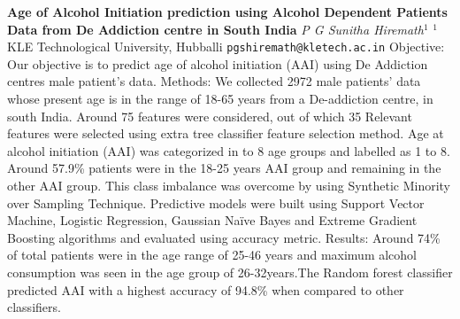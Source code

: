 
    \begin{conf-abstract}[]
        {\textbf{Age of Alcohol Initiation prediction using Alcohol Dependent Patients Data from De Addiction centre in South India}}
        {\textit{P G Sunitha Hiremath$^{1}$}}
        {$^{1}$KLE Technological University, Hubballi}
        {\texttt{pgshiremath@kletech.ac.in}}
        {Objective: Our objective is to predict age of alcohol initiation (AAI) using De Addiction centres male patient's data. Methods: We collected 2972 male patients' data whose present age is in the range of 18-65 years from a De-addiction centre, in south India. Around 75 features were considered, out of which 35 Relevant features were selected using extra tree classifier feature selection method. Age at alcohol initiation (AAI) was categorized in to 8 age groups and labelled as 1 to 8.  Around 57.9\% patients were in the 18-25 years AAI group and remaining in the other AAI group. This class imbalance was overcome by using Synthetic Minority over Sampling Technique. Predictive models were built using Support Vector Machine, Logistic Regression, Gaussian Naïve Bayes and Extreme Gradient Boosting algorithms and evaluated using accuracy metric. Results: Around 74\% of total patients were in the age range of 25-46 years and maximum alcohol consumption was seen in the age group of 26-32years.The Random forest classifier predicted AAI with a highest accuracy of 94.8\% when compared to other classifiers. }
    \end{conf-abstract}
        
